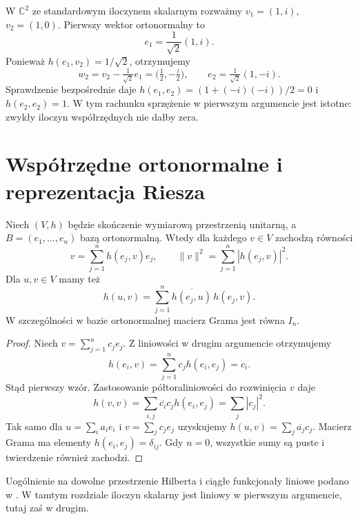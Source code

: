 \begin{przyklad}
\label{prz:lin12-gs-c2}
W \(\mathbb C^2\) ze standardowym
iloczynem skalarnym rozważmy
\(v_1=(1,i)\), \(v_2=(1,0)\).
Pierwszy wektor ortonormalny to
\[
 e_1=\frac1{\sqrt2}(1,i).
\]
Ponieważ
\(h(e_1,v_2)=1/\sqrt2\),
otrzymujemy
\[
 w_2=v_2-\tfrac1{\sqrt2}e_1
    =\bigl(\tfrac12,-\tfrac i2\bigr),
 \qquad
 e_2=\tfrac1{\sqrt2}(1,-i).
\]
Sprawdzenie bezpośrednie daje
\(h(e_1,e_2)=(1+(-i)(-i))/2=0\)
i \(h(e_2,e_2)=1\).
W tym rachunku sprzężenie
w pierwszym argumencie
jest istotne: zwykły iloczyn
współrzędnych nie dałby zera.
\end{przyklad}


\section{Współrzędne ortonormalne i reprezentacja Riesza}
\label{sec:lin12-riesz}

\begin{stwierdzenie}
\label{prop:lin12-wspolrzedne}
Niech \((V,h)\) będzie skończenie
wymiarową przestrzenią unitarną,
a \(B=(e_1,\ldots,e_n)\)
bazą ortonormalną. Wtedy dla każdego
\(v\in V\) zachodzą równości
\[
 v=\sum_{j=1}^n h(e_j,v)e_j,\qquad
 \|v\|^2=\sum_{j=1}^n|h(e_j,v)|^2.
\]
Dla \(u,v\in V\) mamy też
\[
 h(u,v)=\sum_{j=1}^n
       \overline{h(e_j,u)}\,h(e_j,v).
\]
W szczególności w bazie ortonormalnej
macierz Grama jest równa \(I_n\).
\end{stwierdzenie}
\begin{proof}
Niech \(v=\sum_{j=1}^n c_je_j\).
Z liniowości w drugim argumencie
otrzymujemy
\[
 h(e_i,v)=\sum_{j=1}^n c_jh(e_i,e_j)=c_i.
\]
Stąd pierwszy wzór.
Zastosowanie półtoraliniowości
do rozwinięcia \(v\) daje
\[
 h(v,v)=\sum_{i,j}\overline{c_i}c_j
          h(e_i,e_j)=\sum_j|c_j|^2.
\]
Tak samo dla \(u=\sum_i a_ie_i\)
i \(v=\sum_j c_je_j\) uzyskujemy
\(h(u,v)=\sum_j\overline{a_j}c_j\).
Macierz Grama ma elementy
\(h(e_i,e_j)=\delta_{ij}\).
Gdy \(n=0\), wszystkie sumy są
puste i twierdzenie również zachodzi.
\end{proof}

Uogólnienie na dowolne przestrzenie Hilberta i ciągłe funkcjonały liniowe podano w . W tamtym rozdziale iloczyn skalarny jest liniowy w pierwszym argumencie, tutaj zaś w drugim.

